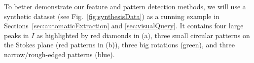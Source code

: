 To better demonstrate our feature and pattern detection methods, we will use a synthetic dataset (see Fig.~\ref{fig:synthesisData}) as a running example in Sections~\ref{sec:automaticExtraction} and \ref{sec:visualQuery}.
It contains four large peaks in $I$ as highlighted by red diamonds in (a), three small circular patterns on the Stokes plane (red patterns in (b)), three big rotations (green), and three narrow/rough-edged patterns (blue).




